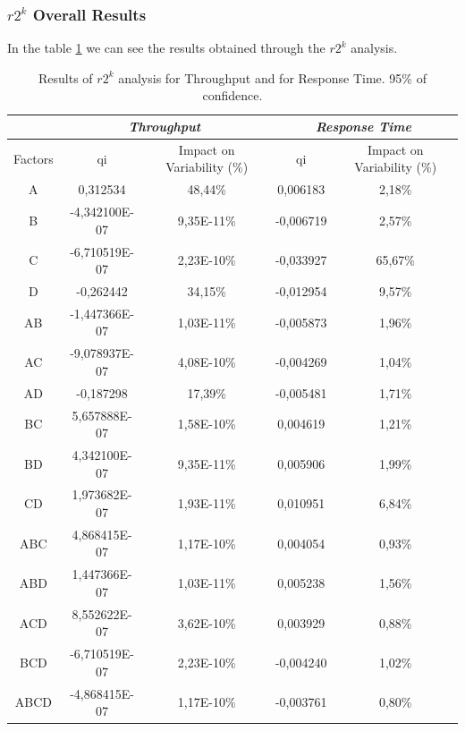 \subsubsection{$r2^k$ Overall Results}
In the table \ref{tab: 2kr_results} we can see the results obtained through the $r2^k$ analysis.
\begin{table}[H]
	\centering
	\begin{tabular}{|c|c|c|c|c|}
		\hline
		\textbf{} & \multicolumn{2}{c|}{\textit{\textbf{Throughput}}} & \multicolumn{2}{c|}{\textit{\textbf{Response Time}}} \\ \hline
		Factors   & qi          & Impact on Variability (\%)          & qi            & Impact on Variability (\%)           \\ \hline
		A    & 0,312534      & 48,44\%    & 0,006183  & 2,18\%  \\ \hline
		B    & -4,342100E-07 & 9,35E-11\% & -0,006719 & 2,57\%  \\ \hline
		C    & -6,710519E-07 & 2,23E-10\% & -0,033927 & 65,67\% \\ \hline
		D    & -0,262442     & 34,15\%    & -0,012954 & 9,57\%  \\ \hline
		AB   & -1,447366E-07 & 1,03E-11\% & -0,005873 & 1,96\%  \\ \hline
		AC   & -9,078937E-07 & 4,08E-10\% & -0,004269 & 1,04\%  \\ \hline
		AD   & -0,187298     & 17,39\%    & -0,005481 & 1,71\%  \\ \hline
		BC   & 5,657888E-07  & 1,58E-10\% & 0,004619  & 1,21\%  \\ \hline
		BD   & 4,342100E-07  & 9,35E-11\% & 0,005906  & 1,99\%  \\ \hline
		CD   & 1,973682E-07  & 1,93E-11\% & 0,010951  & 6,84\%  \\ \hline
		ABC  & 4,868415E-07  & 1,17E-10\% & 0,004054  & 0,93\%  \\ \hline
		ABD  & 1,447366E-07  & 1,03E-11\% & 0,005238  & 1,56\%  \\ \hline
		ACD  & 8,552622E-07  & 3,62E-10\% & 0,003929  & 0,88\%  \\ \hline
		BCD  & -6,710519E-07 & 2,23E-10\% & -0,004240 & 1,02\%  \\ \hline
		ABCD & -4,868415E-07 & 1,17E-10\% & -0,003761 & 0,80\%  \\ \hline
	\end{tabular}
	\caption{Results of $r2^k$ analysis for Throughput and for Response Time. 95\% of confidence.}
	\label{tab: 2kr_results}
\end{table}
																
